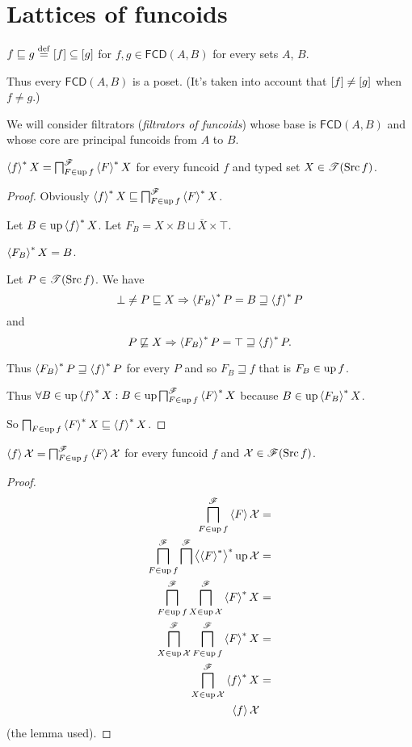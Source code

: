 \section{Lattices of funcoids}
\begin{defn}
$f\sqsubseteq g\overset{\mathrm{def}}{=}\mathord{\mathrel{\left[f\right]}}\subseteq\mathord{\mathrel{\left[g\right]}}$ for $f,g\in\mathsf{FCD}(A,B)$
for every sets $A$, $B$.
\end{defn}
Thus every $\mathsf{FCD}(A,B)$ is a poset. (It's taken into account
that $\mathord{\mathrel{\left[f\right]}}\ne\mathord{\mathrel{\left[g\right]}}$ when $f\ne g$.)

We will consider filtrators (\emph{filtrators
of funcoids}) whose base is $\mathsf{FCD}(A,B)$ and whose core are
principal funcoids from $A$ to $B$.
\begin{lem}\label{fcd-up-x-lem}
$\left\langle f\right\rangle ^{\ast}X=\bigsqcap_{F\in\operatorname{up} f}^{\mathscr{F}}\left\langle F\right\rangle ^{\ast}X$ for
every funcoid $f$ and typed set $X\in\mathscr{T}(\operatorname{Src} f)$.\end{lem}
\begin{proof}
Obviously $\left\langle f\right\rangle ^{\ast}X\sqsubseteq\bigsqcap_{F\in\operatorname{up} f}^{\mathscr{F}}\left\langle F\right\rangle ^{\ast}X$.

Let $B\in\operatorname{up}\left\langle f\right\rangle ^{\ast}X$. Let $F_{B}=X\times B\sqcup\overline{X}\times\top$.

$\left\langle F_{B}\right\rangle ^{\ast}X=B$.

Let $P\in\mathscr{T}(\operatorname{Src} f)$. We have
\[
\bot\ne P\sqsubseteq
X\Rightarrow\left\langle F_{B}\right\rangle ^{\ast}P=B\sqsupseteq\left\langle f\right\rangle ^{\ast}P
\]
and
\[
P\not\sqsubseteq
X\Rightarrow\left\langle F_{B}\right\rangle ^{\ast}P=\top\sqsupseteq\left\langle f\right\rangle ^{\ast}P.
\]


Thus $\left\langle F_{B}\right\rangle ^{\ast}P\sqsupseteq\left\langle f\right\rangle ^{\ast}P$ for every $P$ and
so $F_{B}\sqsupseteq f$ that
is $F_{B}\in\operatorname{up} f$.

Thus $\forall B\in\operatorname{up}\left\langle f\right\rangle ^{\ast}X:B\in\operatorname{up}\bigsqcap_{F\in\operatorname{up}
f}^{\mathscr{F}}\left\langle F\right\rangle ^{\ast}X$
because $B\in\operatorname{up}\left\langle F_{B}\right\rangle ^{\ast}X$.

So $\bigsqcap_{F\in\operatorname{up} f}\left\langle F\right\rangle ^{\ast}X\sqsubseteq\left\langle f\right\rangle ^{\ast}X$.\end{proof}
\begin{thm}
\label{fcd-up-x}$\left\langle f\right\rangle\mathcal{X}=\bigsqcap_{F\in\operatorname{up} f}^{\mathscr{F}}\left\langle F\right\rangle\mathcal{X}$
for every funcoid $f$ and $\mathcal{X}\in\mathscr{F}(\operatorname{Src} f)$.\end{thm}
\begin{proof}
~
\begin{align*}
\bigsqcap_{F\in\operatorname{up} f}^{\mathscr{F}}\left\langle F\right\rangle\mathcal{X} & =\\
\bigsqcap_{F\in\operatorname{up} f}^{\mathscr{F}}\bigsqcap^{\mathscr{F}}\left\langle \left\langle F\right\rangle ^{\ast}\right\rangle ^{\ast}\operatorname{up}\mathcal{X} & =\\
\bigsqcap_{F\in\operatorname{up}
f}^{\mathscr{F}}\bigsqcap_{X\in\operatorname{up}\mathcal{X}}^{\mathscr{F}}\left\langle F\right\rangle ^{\ast}X & =\\
\bigsqcap_{X\in\operatorname{up}\mathcal{X}}^{\mathscr{F}}\bigsqcap_{F\in\operatorname{up}
f}^{\mathscr{F}}\left\langle F\right\rangle ^{\ast}X & =\\
\bigsqcap_{X\in\operatorname{up}\mathcal{X}}^{\mathscr{F}}\left\langle f\right\rangle ^{\ast}X & =\\
\left\langle f\right\rangle\mathcal{X}
\end{align*}
(the lemma used).
\end{proof}
